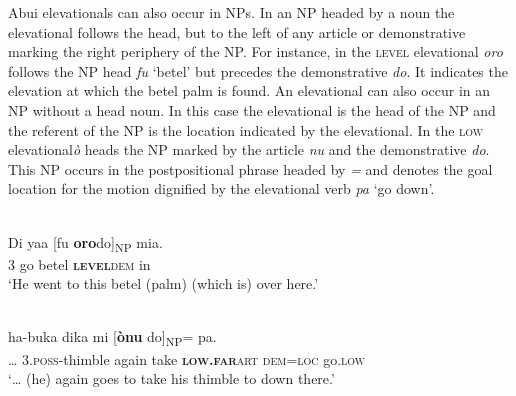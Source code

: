Abui elevationals can also occur in NPs. In an NP headed by a noun the elevational follows the head, but to the left of any article or demonstrative marking the right periphery of the NP. For instance, in  the \textsc{level} elevational \textit{oro} follows the NP head \textit{fu} `betel' but precedes the demonstrative \textit{do}. It indicates the elevation at which the betel palm is found. An elevational can also occur in an NP without a head noun. In this case the elevational is the head of the NP and the referent of the NP is the location indicated by the elevational. In  the \textsc{low} elevational\textit {\`o} heads the NP marked by the article \textit{nu} and the demonstrative \textit{do}. This NP occurs in the postpositional phrase headed by \textit{={\ng}} and denotes the goal location for the motion dignified by the elevational verb \textit{pa} `go down'.



\ea%
\label{ex:7:11}
 \\
\gll Di  yaa  [fu \textbf{oro}do]\textsubscript{NP} mia. \\
  \textsc{3} go   betel  \textbf{\textsc{level}}\textsc{dem} in  \\
\glt   `He went to this betel (palm) (which is) over here.'  
\z

  

 



 

\ea%
\label{ex:7:12}
 \\
\gll {\dots} ha-buka{\ng} dika{\ng} mi     [\textbf{{\`o}nu}    do]\textsubscript{NP}={\ng}    pa. \\
  {\dots} 3.\textsc{poss}{}-thimble  again  take  \textbf{\textsc{low.far}}\textsc   {art  dem=loc} go.\textsc{low}  \\
\glt `{\dots} (he) again goes to take his thimble to down there.' 
\z

 

   

  

